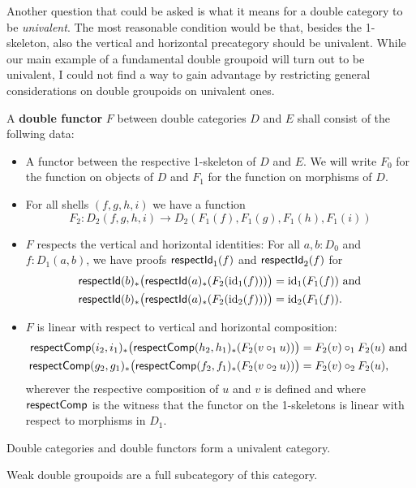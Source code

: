 Another question that could be asked is what it means for a double category to
be \emph{univalent}.
The most reasonable condition would be that, besides the 1-skeleton, also the
vertical and horizontal precategory should be univalent.
While our main example of a fundamental double groupoid will turn out to be univalent,
I could not find a way to gain advantage by restricting general considerations
on double groupoids on univalent ones. %

\begin{defn} \label{defl:dbl-functor-hott}
A \textbf{double functor} $F$ between double categories $D$ and $E$ shall consist
of the follwing data:
\begin{itemize}
\item A functor between the respective 1-skeleton of $D$ and $E$.
We will write $F_0$ for the function on objects of $D$ and $F_1$ for the function
on morphisms of $D$.
\item For all shells $(f,g,h,i)$ we have a function
\begin{equation*}
F_2 : D_2(f,g,h,i) \to D_2(F_1(f),F_1(g),F_1(h),F_1(i))
\end{equation*}
\item $F$ respects the vertical and horizontal identities: For all $a,b:D_0$
and $f:D_1(a,b)$, we have proofs $\mathsf{respectId}_1(f)$ and $\mathsf{respectId}_2(f)$ for
\begin{align*}
\mathsf{respectId}(b)_*\big(\mathsf{respectId}(a)_*(F_2(\operatorname{id}_1(f)))\big) &= \operatorname{id}_1(F_1(f)) \text{ and} \\
\mathsf{respectId}(b)_*\big(\mathsf{respectId}(a)_*(F_2(\operatorname{id}_2(f)))\big) &= \operatorname{id}_2(F_1(f)) \text{.}
\end{align*}
\item $F$ is linear with respect to vertical and horizontal composition:
\begin{align*}
\mathsf{respectComp}(i_2,i_1)_*\big(\mathsf{respectComp}(h_2,h_1)_*(F_2(v \circ_1 u))\big)
	&= F_2(v) \circ_1 F_2(u) \text{ and } \\
\mathsf{respectComp}(g_2,g_1)_*\big(\mathsf{respectComp}(f_2,f_1)_*(F_2(v \circ_2 u))\big)
	&= F_2(v) \circ_2 F_2(u) \text{,}
\end{align*}
wherever the respective composition of $u$ and $v$ is defined and where
$\mathsf{respectComp}$ is the witness that the functor on the 1-skeletons is linear with
respect to morphisms in $D_1$.
\end{itemize}
\end{defn}

\begin{lemma}
Double categories and double functors form a univalent category.

Weak double groupoids are a full subcategory of this category.
\end{lemma}


